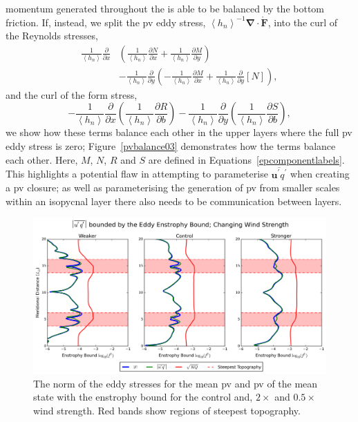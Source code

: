 \documentclass[12pt,a4paper]{report}
\newcommand*\thkmean[1]{\overline{#1}}
\newcommand*\thkres[1]{{#1}^{\prime}}
\newcommand*\nthkmean[1]{\left\langle{#1}\right\rangle}
\newcommand*\spec[1]{\mathring{#1}}
\newcommand*\figref[1]{Figure~\ref{#1}}
\newcommand*{\partialdiff}[2][{}]{\frac{\partial #1}{\partial #2}}
\begin{document}
  momentum generated throughout the is able to be balanced by the bottom friction.
  If, instead, we split the \gls{pv} eddy stress, $\nthkmean{h_{n}}^{-1}
  \boldsymbol{\nabla}\cdot\boldsymbol{\spec{F}}$, into the curl of the
  Reynolds stresses,
  \begin{equation}
  \begin{split}
  \frac{1}{\nthkmean{h_{n}}}\partialdiff{x}&\left(
  \frac{1}{\nthkmean{h_{n}}}\partialdiff[N]{x} +
  \frac{1}{\nthkmean{h_{n}}}\partialdiff[M]{y}\right)\\ &-
  \frac{1}{\nthkmean{h_{n}}}\partialdiff{y}\left(
  -\frac{1}{\nthkmean{h_{n}}}\partialdiff[M]{x} +
  \frac{1}{\nthkmean{h_{n}}}\partialdiff{y}[N]\right),
  \end{split}
  \end{equation}
  and the curl of the form stress,
  \begin{equation}
  -\frac{1}{\nthkmean{h_{n}}}\partialdiff{x}\left(
  \frac{1}{\nthkmean{h_{n}}}\partialdiff[R]{b}\right) -
  \frac{1}{\nthkmean{h_{n}}}\partialdiff{y}\left(
  \frac{1}{\nthkmean{h_{n}}}\partialdiff[S]{b}\right) ,
  \end{equation} 
  we show how these terms balance each other in
  the upper layers where the full \gls{pv} eddy stress is zero; \figref{pvbalance03}
  demonstrates how the terms balance each other. Here, $M$, $N$, $R$ and $S$ are defined in
   Equations~\ref{epcomponentlabels}.  This highlights a potential flaw in
   attempting to parameterise $\thkmean{\thkres{\boldsymbol{u}}\thkres{q}}$ when 
   creating a \gls{pv} closure; as well as parameterising the generation 
   of \gls{pv} from smaller scales within an isopycnal layer there also
   needs to be communication between layers. 
   
   \begin{figure}
   	\centering
   	\includegraphics[width=\linewidth]{eqbound_0_1}
   	\caption{ The norm of the eddy stresses for the mean \gls{pv} and
   		\gls{pv} of the mean state with the enstrophy bound for
   		the control and, $2\times$ and  $0.5\times$ wind strength. Red bands show regions of steepest topography. }
   	\label{eqbound01}
   \end{figure}
   
\end{document}
